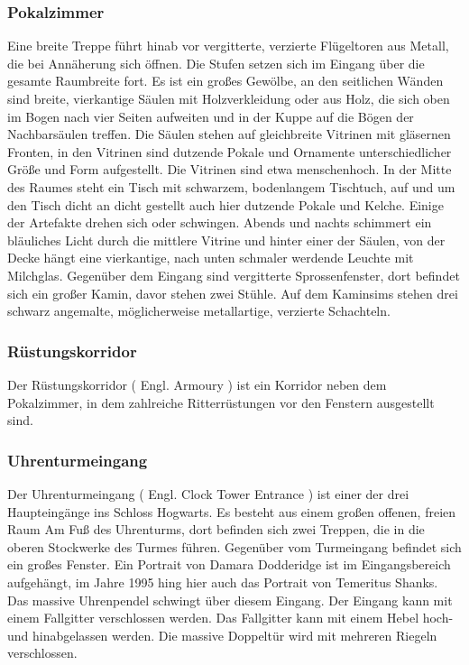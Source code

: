 \documentclass[a4paper, 10pt]{article}
\begin{document}
\subsubsection*{\large Pokalzimmer}
Eine breite Treppe führt hinab vor vergitterte, verzierte Flügeltoren aus Metall, die bei Annäherung sich öffnen. Die Stufen setzen sich im Eingang über die gesamte Raumbreite fort. Es ist ein großes Gewölbe, an den seitlichen Wänden sind breite, vierkantige Säulen mit Holzverkleidung oder aus Holz, die sich oben im Bogen nach vier Seiten aufweiten und in der Kuppe auf die Bögen der Nachbarsäulen treffen. Die Säulen stehen auf gleichbreite Vitrinen mit gläsernen Fronten, in den Vitrinen sind dutzende Pokale und Ornamente unterschiedlicher Größe und Form aufgestellt. Die Vitrinen sind etwa menschenhoch.
\vspace{10pt}
\newline
{}  
In der Mitte des Raumes steht ein Tisch mit schwarzem, bodenlangem Tischtuch, auf und um den Tisch dicht an dicht gestellt auch hier dutzende Pokale und Kelche. Einige der Artefakte drehen sich oder schwingen. Abends und nachts schimmert ein bläuliches Licht durch die mittlere Vitrine und hinter einer der Säulen, von der Decke hängt eine vierkantige, nach unten schmaler werdende Leuchte mit Milchglas. Gegenüber dem Eingang sind vergitterte Sprossenfenster, dort befindet sich ein großer Kamin, davor stehen zwei Stühle. Auf dem Kaminsims stehen drei schwarz angemalte, möglicherweise metallartige, verzierte Schachteln.
\subsubsection*{\large Rüstungskorridor}
Der Rüstungskorridor (  Engl.  Armoury ) ist ein Korridor neben dem Pokalzimmer, in dem zahlreiche Ritterrüstungen vor den Fenstern ausgestellt sind.
\subsubsection*{\large Uhrenturmeingang}
Der Uhrenturmeingang (  Engl.  Clock Tower Entrance ) ist einer der drei Haupteingänge ins Schloss Hogwarts. Es besteht aus einem großen offenen, freien Raum Am Fuß des Uhrenturms, dort befinden sich zwei Treppen, die in die oberen Stockwerke des Turmes führen. Gegenüber vom Turmeingang befindet sich ein großes Fenster. Ein Portrait von Damara Dodderidge ist im Eingangsbereich aufgehängt, im Jahre 1995 hing hier auch das Portrait von Temeritus Shanks.
\vspace{10pt}
\newline
{}  
Das massive Uhrenpendel schwingt über diesem Eingang. Der Eingang kann mit einem Fallgitter verschlossen werden. Das Fallgitter kann mit einem Hebel hoch- und hinabgelassen werden. Die massive Doppeltür wird mit mehreren Riegeln verschlossen.
\end{document}
